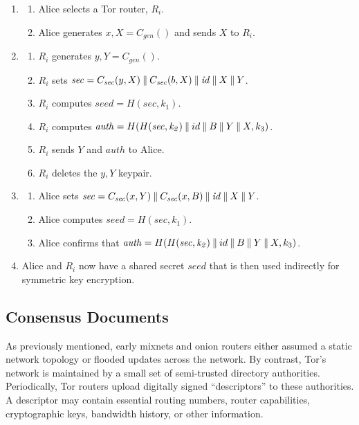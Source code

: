 \begin{enumerate} %
	\item \label{item:First2}
		\begin{enumerate}
			\item Alice selects a Tor router, $ R_{i} $.
			\item Alice generates $ x,X = C_{\mathit{gen}}() $ and sends $ X $ to $ R_{i} $.
		\end{enumerate}
	\item
		\begin{enumerate}
			\item $ R_{i} $ generates $ y,Y = C_{\mathit{gen}}() $.
			\item $ R_{i} $ sets $ \mathit{sec} = C_{\mathit{sec}}(y, X) \mathbin{\|} C_{\mathit{sec}}(b, X) \mathbin{\|} \mathit{id} \mathbin{\|} X \mathbin{\|} Y $.
			\item $ R_{i} $ computes $ \mathit{seed} = H(\mathit{sec, k_{1}}) $.
			\item $ R_{i} $ computes $ \mathit{auth} = H(H(\mathit{sec, k_{2}}) \mathbin{\|} id \mathbin{\|} B \mathbin{\|} Y \mathbin{\|} X, k_{3}) $.
			\item $ R_{i} $ sends $ Y $ and $ \mathit{auth} $ to Alice.
			\item $ R_{i} $ deletes the $ y,Y $ keypair.
		\end{enumerate}
	\item
		\begin{enumerate}
			\item Alice sets $ \mathit{sec} = C_{\mathit{sec}}(x, Y) \mathbin{\|} C_{\mathit{sec}}(x, B) \mathbin{\|} \mathit{id} \mathbin{\|} X \mathbin{\|} Y $.
			\item Alice computes $ \mathit{seed} = H(\mathit{sec, k_{1}}) $.
			\item Alice confirms that $ \mathit{auth} = H(H(\mathit{sec, k_{2}}) \mathbin{\|} id \mathbin{\|} B \mathbin{\|} Y \mathbin{\|} X, k_{3}) $.
		\end{enumerate}
	\item
		Alice and $ R_{i} $ now have a shared secret $ \mathit{seed} $ that is then used indirectly for symmetric key encryption.	
\end{enumerate}

\subsection{Consensus Documents}
\label{sec:ConsensusDocs}

As previously mentioned, early mixnets and onion routers either assumed a static network topology or flooded updates across the network. By contrast, Tor's network is maintained by a small set of semi-trusted directory authorities. Periodically, Tor routers upload digitally signed ``descriptors'' to these authorities. A descriptor may contain essential routing numbers, router capabilities, cryptographic keys, bandwidth history, or other information.

